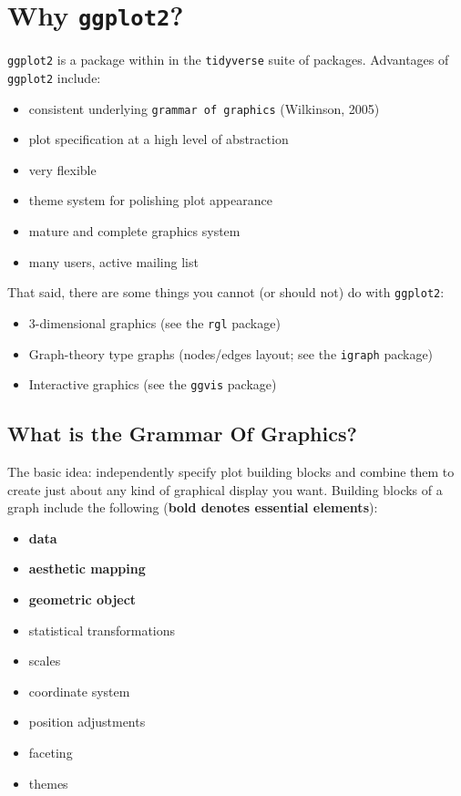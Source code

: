 \documentclass[]{book}
\providecommand{\tightlist}{%
  \setlength{\itemsep}{0pt}\setlength{\parskip}{0pt}}
\begin{document}
\section{\texorpdfstring{Why
\texttt{ggplot2}?}{Why ggplot2?}}\label{why-ggplot2}

\texttt{ggplot2} is a package within in the \texttt{tidyverse} suite of
packages. Advantages of \texttt{ggplot2} include:

\begin{itemize}
\tightlist
\item
  consistent underlying \texttt{grammar\ of\ graphics} (Wilkinson, 2005)
\item
  plot specification at a high level of abstraction
\item
  very flexible
\item
  theme system for polishing plot appearance
\item
  mature and complete graphics system
\item
  many users, active mailing list
\end{itemize}

That said, there are some things you cannot (or should not) do with
\texttt{ggplot2}:

\begin{itemize}
\tightlist
\item
  3-dimensional graphics (see the \texttt{rgl} package)
\item
  Graph-theory type graphs (nodes/edges layout; see the \texttt{igraph}
  package)
\item
  Interactive graphics (see the \texttt{ggvis} package)
\end{itemize}

\subsection{What is the Grammar Of
Graphics?}\label{what-is-the-grammar-of-graphics}

The basic idea: independently specify plot building blocks and combine
them to create just about any kind of graphical display you want.
Building blocks of a graph include the following (\textbf{bold denotes
essential elements}):

\begin{itemize}
\tightlist
\item
  \textbf{data}
\item
  \textbf{aesthetic mapping}
\item
  \textbf{geometric object}
\item
  statistical transformations
\item
  scales
\item
  coordinate system
\item
  position adjustments
\item
  faceting
\item
  themes
\end{itemize}
\end{document}
